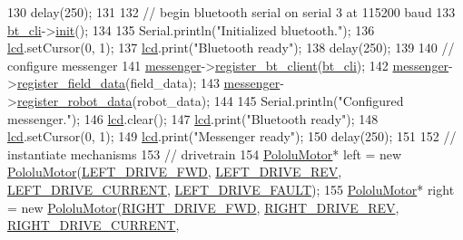 \begin{DoxyCode}
130     delay(250);
131 
132     \textcolor{comment}{// begin bluetooth serial on serial 3 at 115200 baud}
133     \hyperlink{rbe2001_8ino_ae2ff51c6b65a5b568253ca01270200bc}{bt\_cli}->\hyperlink{class_bluetooth_client_ac054e730dd69d8e323781305ea1a610f}{init}();
134 
135     Serial.println(\textcolor{stringliteral}{"Initialized bluetooth."});
136     \hyperlink{rbe2001_8ino_a4cbb289153633c01a1584b3aa0d9a0a2}{lcd}.setCursor(0, 1);
137     \hyperlink{rbe2001_8ino_a4cbb289153633c01a1584b3aa0d9a0a2}{lcd}.print(\textcolor{stringliteral}{"Bluetooth ready"});
138     delay(250);
139 
140     \textcolor{comment}{// configure messenger}
141     \hyperlink{rbe2001_8ino_a48342badc24a04d2310ca16ff4a3711b}{messenger}->\hyperlink{class_messenger_a8412ddd8931fa6b49a2ad3a2f52cad31}{register\_bt\_client}(\hyperlink{rbe2001_8ino_ae2ff51c6b65a5b568253ca01270200bc}{bt\_cli});
142     \hyperlink{rbe2001_8ino_a48342badc24a04d2310ca16ff4a3711b}{messenger}->\hyperlink{class_messenger_a1416b79fce99fd7b1aa13d07113546a7}{register\_field\_data}(field\_data);
143     \hyperlink{rbe2001_8ino_a48342badc24a04d2310ca16ff4a3711b}{messenger}->\hyperlink{class_messenger_ade23d550433aaa39bd08b4dd092bceeb}{register\_robot\_data}(robot\_data);
144 
145     Serial.println(\textcolor{stringliteral}{"Configured messenger."});
146     \hyperlink{rbe2001_8ino_a4cbb289153633c01a1584b3aa0d9a0a2}{lcd}.clear();
147     \hyperlink{rbe2001_8ino_a4cbb289153633c01a1584b3aa0d9a0a2}{lcd}.print(\textcolor{stringliteral}{"Bluetooth ready"});
148     \hyperlink{rbe2001_8ino_a4cbb289153633c01a1584b3aa0d9a0a2}{lcd}.setCursor(0, 1);
149     \hyperlink{rbe2001_8ino_a4cbb289153633c01a1584b3aa0d9a0a2}{lcd}.print(\textcolor{stringliteral}{"Messenger ready"});
150     delay(250);
151 
152     \textcolor{comment}{// instantiate mechanisms}
153     \textcolor{comment}{// drivetrain}
154     \hyperlink{class_pololu_motor}{PololuMotor}* left = \textcolor{keyword}{new} \hyperlink{class_pololu_motor}{PololuMotor}(\hyperlink{config_8h_a6c3954a80d126cf2e223c6237d99e31d}{LEFT\_DRIVE\_FWD}, 
      \hyperlink{config_8h_a6da1669f3da4ff0bc1e0d3da9320b8e5}{LEFT\_DRIVE\_REV}, \hyperlink{config_8h_abe0c840eaea3f7ff8b2384aa92b2a2bd}{LEFT\_DRIVE\_CURRENT}, 
      \hyperlink{config_8h_aa66abce5d6ccd9950a72510295c869ff}{LEFT\_DRIVE\_FAULT});
155     \hyperlink{class_pololu_motor}{PololuMotor}* right = \textcolor{keyword}{new} \hyperlink{class_pololu_motor}{PololuMotor}(\hyperlink{config_8h_afc0e1801893e7709be9b9d4927199f7d}{RIGHT\_DRIVE\_FWD}, 
      \hyperlink{config_8h_a84fcbc365569d2fc976b700b717ea853}{RIGHT\_DRIVE\_REV}, \hyperlink{config_8h_a52d355f964797442389aad5708607800}{RIGHT\_DRIVE\_CURRENT}, 

\end{DoxyCode}
